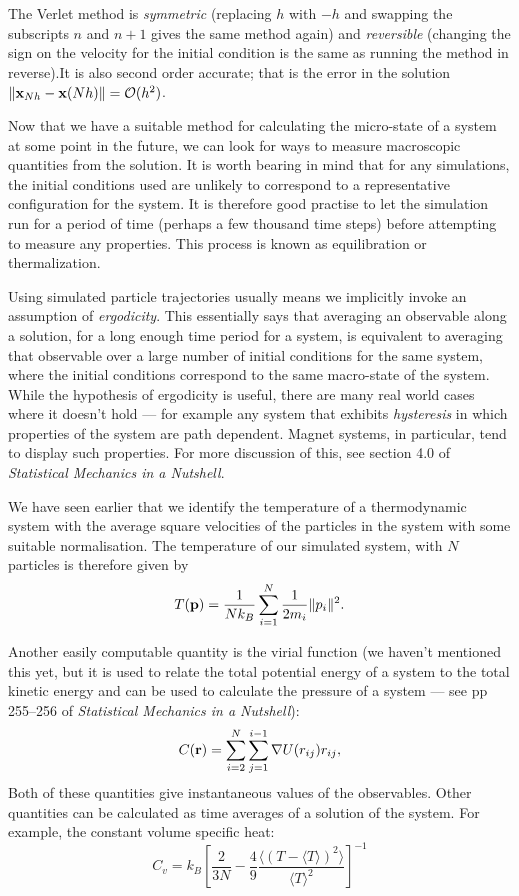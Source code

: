 \documentclass{article}
\begin{document}
The Verlet method is \emph{symmetric} (replacing $h$ with $-h$ and swapping the subscripts $n$ and $n+1$ gives the same method again) and \emph{reversible} (changing the sign on the velocity for the initial condition is the same as running the method in reverse).It is also second order accurate; that is the error in the solution $\|{\bf x}_{Nh}-{\bf x}(Nh)\|=\mathcal{O}(h^2)$.

Now that we have a suitable method for calculating the micro-state of a system at some point in the future, we can look for ways to measure macroscopic quantities from the solution. It is worth bearing in mind that for any simulations, the initial conditions used are unlikely to correspond to a representative configuration for the system. It is therefore good practise to let the simulation run for a period of time (perhaps a few thousand time steps) before attempting to measure any properties. This process is known as equilibration or thermalization.

Using simulated particle trajectories usually means we implicitly invoke an assumption of \emph{ergodicity}. This essentially says that averaging an observable along a solution, for a long enough time period for a system, is equivalent to averaging that observable over a large number of initial conditions for the same system, where the initial conditions correspond to the same macro-state of the system. While the hypothesis of ergodicity is useful, there are many real world cases where it doesn't hold --- for example any system that exhibits \emph{hysteresis} in which properties of the system are path dependent. Magnet systems, in particular, tend to display such properties. For more discussion of this, see section 4.0 of \emph{Statistical Mechanics in a Nutshell}.

We have seen earlier that we identify the temperature of a thermodynamic system with the average square velocities of the particles in the system with some suitable normalisation. The temperature of our simulated system, with $N$ particles is therefore given by
$$
	T({\bf p}) = \frac{1}{Nk_B}\sum_{i=1}^N\frac{1}{2m_i}\|p_i\|^2.
$$

Another easily computable quantity is the virial function (we haven't mentioned this yet, but it is used to relate the total potential energy of a system to the total kinetic energy and can be used to calculate the pressure of a system --- see pp 255--256 of \emph{Statistical Mechanics in a Nutshell}):
$$
	C({\bf r}) = \sum_{i=2}^N\sum_{j=1}^{i-1}\nabla U(r_{ij})r_{ij},
$$
Both of these quantities give instantaneous values of the observables. Other quantities can be calculated as time averages of a solution of the system. For example, the constant volume specific heat:
$$
	C_v = k_B\left[\frac{2}{3N}-\frac{4}{9}\frac{\langle(T-\langle T\rangle)^2\rangle}{\langle T\rangle^2}\right]^{-1}
$$
\end{document}
